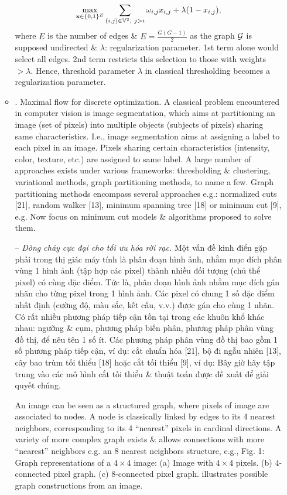 \documentclass{article}
\begin{document}
\begin{itemize}
\begin{itemize}
        \begin{equation*}
            \max_{{\bf x}\in\{0,1\}^E} \sum_{(i,j)\in\mathbb{V}^2,\ j > i} \omega_{i,j}x_{i,j} + \lambda(1 - x_{i,j}),
        \end{equation*}
        where $E$ is the number of edges \& $E = \frac{G(G - 1)}{2}$ as the graph ${\cal G}$ is supposed undirected \& $\lambda$: regularization parameter. 1st term alone would select all edges. 2nd term restricts this selection to those with weights $> \lambda$. Hence, threshold parameter $\lambda$ in classical thresholding becomes a regularization parameter.
        \item {. Maximal flow for discrete optimization.} A classical problem encountered in computer vision is image segmentation, which aims at partitioning an image (set of pixels) into multiple objects (subjects of pixels) sharing same characteristics. I.e., image segmentation aims at assigning a label to each pixel in an image. Pixels sharing certain characteristics (intensity, color, texture, etc.) are assigned to same label. A large number of approaches exists under various frameworks: thresholding \& clustering, variational methods, graph partitioning methods, to name a few. Graph partitioning methods encompass several approaches e.g.: normalized cuts [21], random walker [13], minimum spanning tree [18] or minimum cut [9], e.g. Now focus on minimum cut models \& algorithms proposed to solve them.
        
        -- {\it Dòng chảy cực đại cho tối ưu hóa rời rạc.} Một vấn đề kinh điển gặp phải trong thị giác máy tính là phân đoạn hình ảnh, nhằm mục đích phân vùng 1 hình ảnh (tập hợp các pixel) thành nhiều đối tượng (chủ thể pixel) có cùng đặc điểm. Tức là, phân đoạn hình ảnh nhằm mục đích gán nhãn cho từng pixel trong 1 hình ảnh. Các pixel có chung 1 số đặc điểm nhất định (cường độ, màu sắc, kết cấu, v.v.) được gán cho cùng 1 nhãn. Có rất nhiều phương pháp tiếp cận tồn tại trong các khuôn khổ khác nhau: ngưỡng \& cụm, phương pháp biến phân, phương pháp phân vùng đồ thị, để nêu tên 1 số ít. Các phương pháp phân vùng đồ thị bao gồm 1 số phương pháp tiếp cận, ví dụ: cắt chuẩn hóa [21], bộ đi ngẫu nhiên [13], cây bao trùm tối thiểu [18] hoặc cắt tối thiểu [9], ví dụ: Bây giờ hãy tập trung vào các mô hình cắt tối thiểu \& thuật toán được đề xuất để giải quyết chúng.
        
        An image can be seen as a structured graph, where pixels of image are associated to nodes. A node is classically linked by edges to its 4  nearest neighbors, corresponding to its 4 ``nearest'' pixels in cardinal directions. A variety of more complex graph exists \& allows connections with more ``nearest'' neighbors e.g. an $8$ nearest neighbors structure, e.g., {\sf Fig. 1: Graph representations of a $4\times4$ image: (a) Image with $4\times4$ pixels. (b) $4$-connected pixel graph. (c) $8$-connected pixel graph.} illustrates possible graph constructions from an image.
        

\end{itemize}
\end{itemize}
\end{document}
